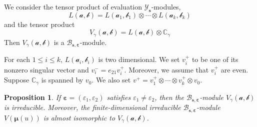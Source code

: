 \documentclass[11pt,reqno]{amsart}
\numberwithin{equation}{section}
\newtheorem{prop}[thm]{Proposition}
\theoremstyle{definition}
\theoremstyle{remark}
\newcommand{\C}{\mathbb{C}}
\newcommand{\mc}{\mathcal}
\newcommand{\bC}{\mathbb{C}}
\newcommand{\lle}{\leqslant}
\newcommand{\YMN}{{\mathscr{Y}_{\bm s}}}
\newcommand{\BMN}{{\mathscr{B}_{\bm s,\bm \ve}}}
\newcommand{\ve}{\varepsilon}
\begin{document}
We consider the tensor product of evaluation $\YMN$-modules,
\[
L(\bm{\mc a,\mc b})=L(\mc a_1,\mc b_1)\otimes \cdots\otimes L(\mc a_k,\mc b_k)
\]
and the tensor product
\[
V_{\gamma}(\bm{\mc a,\mc b})=L(\bm{\mc a,\mc b})\otimes \bC_{\gamma}
\]
Then $V_{\gamma}(\bm{\mc a,\mc b})$ is a $\BMN$-module.

For each $1\lle i\lle k$, $L(\mc a_i,\mc b_i)$ is two dimensional. We set $v_i^+$ to be one of its nonzero singular vector and $v_i^-=e_{21}v_i^+$. Moreover, we assume that $v_i^+$ are even. Suppose $\C_\gamma$ is spanned by $v_0$. We also set  $v^+=v_1^+\otimes\cdots\otimes v_k^+\otimes v_0^{}$.
\begin{prop}
If $\bm\ve=(\ve_1,\ve_2)$ satisfies $\ve_1\ne \ve_2$, then the  $\BMN$-module $V_{\gamma}(\bm{\mc a,\mc b})$ is irreducible. Moreover, the finite-dimensional irreducible $\BMN$-module $V(\bm\mu(u))$ is almost isomorphic to $V_{\gamma}(\bm{\mc a,\mc b})$.
\end{prop}
\end{document}
